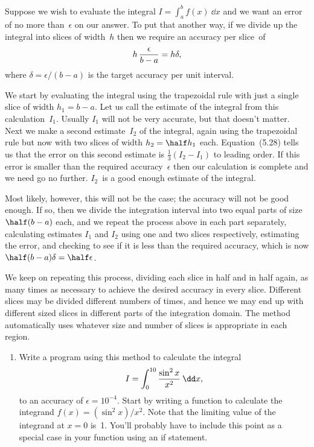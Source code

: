 \documentclass[12pt]{article}
\begin{document}
\begin{exercises}
  Suppose we wish to evaluate the integral $I = \int_a^b f(x) \>\dd x$ and
  we want an error of no more than~$\epsilon$ on our answer.  To put that
  another way, if we divide up the integral into slices of width~$h$ then
  we require an accuracy per slice~of
\begin{displaymath}
h\,{\epsilon\over b-a} = h\delta,
\end{displaymath}
where $\delta = \epsilon/(b-a)$ is the target accuracy per unit interval.

We start by evaluating the integral using the trapezoidal rule with just a
single slice of width $h_1=b-a$.  Let us call the estimate of the integral
from this calculation~$I_1$.  Usually $I_1$ will not be very accurate, but
that doesn't matter.  Next we make a second estimate~$I_2$ of the integral,
again using the trapezoidal rule but now with two slices of width
$h_2=\half h_1$ each.  Equation~(5.28) tells us that the error on this
second estimate is $\frac13(I_2-I_1)$ to leading order.  If this error is
smaller than the required accuracy~$\epsilon$ then our calculation is
complete and we need go no further.  $I_2$~is a good enough estimate of the
integral.

Most likely, however, this will not be the case; the accuracy will not be
good enough.  If so, then we divide the integration interval into two equal
parts of size $\half (b-a)$ each, and we repeat the process above in each
part separately, calculating estimates $I_1$ and $I_2$ using one and two
slices respectively, estimating the error, and checking to see if it is
less than the required accuracy, which is now $\half(b-a)\delta =
\half\epsilon$.

We keep on repeating this process, dividing each slice in half and in half
again, as many times as necessary to achieve the desired accuracy in every
slice.  Different slices may be divided different numbers of times, and
hence we may end up with different sized slices in different parts of the
integration domain.  The method automatically uses whatever size and number
of slices is appropriate in each region.
\begin{enumerate}\setlength{\itemsep}{0pt}
\item Write a program using this method to calculate the integral
\begin{displaymath}
I = \int_0^{10} {\sin^2 x\over x^2} \>\dd x,
\end{displaymath}
to an accuracy of $\epsilon=10^{-4}$.  Start by writing a function to
calculate the integrand $f(x) = (\sin^2 x)/x^2$.  Note that the limiting
value of the integrand at $x=0$ is~1.  You'll probably have to include this
point as a special case in your function using an if statement.


\end{enumerate}
\end{exercises}
\end{document}
